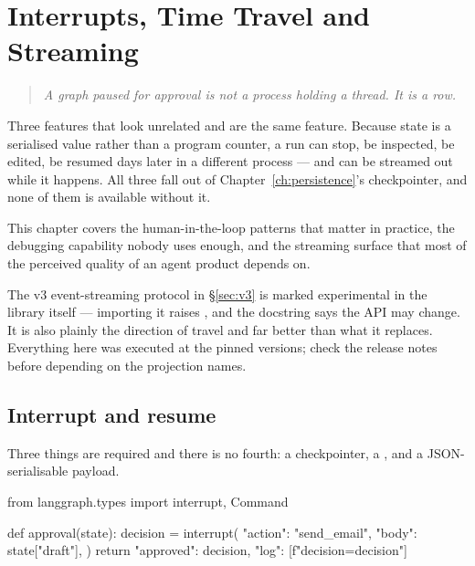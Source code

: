 \chapter{Interrupts, Time Travel and Streaming}
\label{ch:interrupts}

\begin{quote}\itshape
A graph paused for approval is not a process holding a thread. It is a row.
\end{quote}

\noindent
Three features that look unrelated and are the same feature. Because state is a
serialised value rather than a program counter, a run can stop, be inspected, be
edited, be resumed days later in a different process --- and can be streamed out
while it happens. All three fall out of Chapter~\ref{ch:persistence}'s
checkpointer, and none of them is available without it.

This chapter covers the human-in-the-loop patterns that matter in practice, the
debugging capability nobody uses enough, and the streaming surface that most of
the perceived quality of an agent product depends on.

\begin{versionbox}
The v3 event-streaming protocol in \S\ref{sec:v3} is marked experimental in the
library itself --- importing it raises , and the docstring says the API may
change. It is also plainly the direction of travel and far better than what it
replaces. Everything here was executed at the pinned versions; check the release
notes before depending on the projection names.
\end{versionbox}

\section{Interrupt and resume}
\label{sec:interrupt}

Three things are required and there is no fourth: a checkpointer, a
, and a JSON-serialisable payload.

\begin{python}[caption={An approval gate}, label={lst:interrupt}]
from langgraph.types import interrupt, Command


def approval(state):
    decision = interrupt({
        "action": "send_email",
        "body": state["draft"],
    })
    return {"approved": decision, "log": [f"decision={decision}"]}
\end{python}

